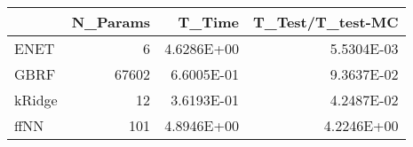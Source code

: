 \begin{tabular}{lrrr}
\toprule
{} &  N\_Params &     T\_Time &  T\_Test/T\_test-MC \\
\midrule
ENET   &         6 & 4.6286E+00 &        5.5304E-03 \\
GBRF   &     67602 & 6.6005E-01 &        9.3637E-02 \\
kRidge &        12 & 3.6193E-01 &        4.2487E-02 \\
ffNN   &       101 & 4.8946E+00 &        4.2246E+00 \\
\bottomrule
\end{tabular}
